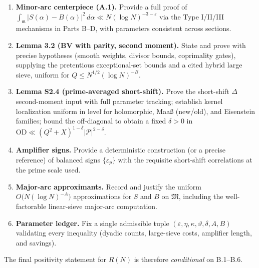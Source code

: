 \documentclass[11pt]{article}
\theoremstyle{definition}
\theoremstyle{remark}
\begin{document}
\begin{enumerate}[label=\textbf{B.\arabic*}]
  \item \textbf{Minor-arc centerpiece (A.1).} Provide a full proof of
  $\int_{\mathfrak m}|S(\alpha)-B(\alpha)|^2\,d\alpha\ll N(\log N)^{-3-\varepsilon}$
  via the Type I/II/III mechanisms in Parts B–D, with parameters consistent across sections.

  \item \textbf{Lemma 3.2 (BV with parity, second moment).} State and prove with precise hypotheses (smooth weights, divisor bounds, coprimality gates), supplying the pretentious exceptional-set bounds and a cited hybrid large sieve, uniform for $Q\le N^{1/2}(\log N)^{-B}$.

  \item \textbf{Lemma S2.4 (prime-averaged short-shift).} Prove the short-shift $\Delta$ second-moment input with full parameter tracking; establish kernel localization uniform in level for holomorphic, Maaß (new/old), and Eisenstein families; bound the off-diagonal to obtain a fixed $\delta>0$ in $\mathrm{OD}\ll (Q^2+X)^{1-\delta}|\mathcal P|^{2-\delta}$.

  \item \textbf{Amplifier signs.} Provide a deterministic construction (or a precise reference) of balanced signs $\{\varepsilon_p\}$ with the requisite short-shift correlations at the prime scale used.

  \item \textbf{Major-arc approximants.} Record and justify the uniform $O\big(N(\log N)^{-A}\big)$ approximations for $S$ and $B$ on $\mathfrak M$, including the well-factorable linear-sieve major-arc computation.

  \item \textbf{Parameter ledger.} Fix a single admissible tuple $(\varepsilon,\eta,\kappa,\vartheta,\delta,A,B)$ validating every inequality (dyadic counts, large-sieve costs, amplifier length, and savings).
\end{enumerate}

The final positivity statement for $R(N)$ is therefore \emph{conditional} on B.1–B.6.
\end{document}
